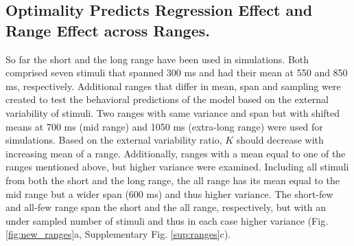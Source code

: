 \documentclass[10pt]{article}
\begin{document}
\subsection{Optimality Predicts Regression Effect and Range Effect across Ranges.}
So far the short and the long range have been used in simulations. Both comprised seven stimuli that spanned 300 ms and had their mean at 550 and 850 ms, respectively. 
Additional ranges that differ in mean, span and sampling were created to test the behavioral predictions of the model based on the external variability of stimuli.  
Two ranges with same variance and span but with shifted means at 700 ms (mid range) and 1050 ms (extra-long range) were used for simulations. Based on the external variability ratio, $K$ should decrease with increasing mean of a range. 
Additionally, ranges with a mean equal to one of the ranges mentioned above, but higher variance were examined.
Including all stimuli from both the short and the long range, the all range has its mean equal to the mid range but a wider span (600 ms) and thus higher variance.
The short-few and all-few range span the short and the all range, respectively, but with an under sampled number of stimuli and thus in each case higher variance
(Fig. \ref{fig:new_ranges}a, Supplementary Fig. \ref{sup:ranges}c).
\end{document}
